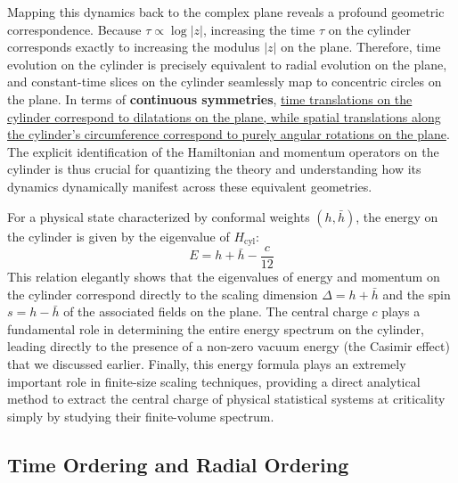 Mapping this dynamics back to the complex plane reveals a profound geometric correspondence. Because \(\tau \propto \log |z|\), increasing the time \(\tau\) on the cylinder corresponds exactly to increasing the modulus \(|z|\) on the plane. Therefore, time evolution on the cylinder is precisely equivalent to radial evolution on the plane, and constant-time slices on the cylinder seamlessly map to concentric circles on the plane. In terms of \textbf{continuous symmetries}, \uline{time translations on the cylinder correspond to dilatations on the plane, while spatial translations along the cylinder's circumference correspond to purely angular rotations on the plane}. The explicit identification of the Hamiltonian and momentum operators on the cylinder is thus crucial for quantizing the theory and understanding how its dynamics dynamically manifest across these equivalent geometries.

For a physical state characterized by conformal weights \((h, \bar{h})\), the energy on the cylinder is given by the eigenvalue of \(H_{\text{cyl}}\):
\[
    E = h + \bar{h} - \frac{c}{12}
\]
This relation elegantly shows that the eigenvalues of energy and momentum on the cylinder correspond directly to the scaling dimension \(\Delta = h + \bar{h}\) and the spin \(s = h - \bar{h}\) of the associated fields on the plane. The central charge \(c\) plays a fundamental role in determining the entire energy spectrum on the cylinder, leading directly to the presence of a non-zero vacuum energy (the Casimir effect) that we discussed earlier. Finally, this energy formula plays an extremely important role in finite-size scaling techniques, providing a direct analytical method to extract the central charge of physical statistical systems at criticality simply by studying their finite-volume spectrum.

\subsection{Time Ordering and Radial Ordering}

